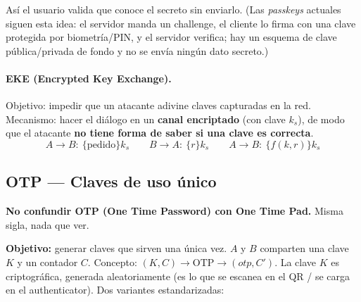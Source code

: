 \documentclass[../main.tex]{subfiles}
\begin{document}
\begin{center}
\end{center}
Así el usuario valida que conoce el secreto sin enviarlo. (Las \emph{passkeys} actuales siguen esta idea: el servidor manda un challenge, el cliente lo firma con una clave protegida por biometría/PIN, y el servidor verifica; hay un esquema de clave pública/privada de fondo y no se envía ningún dato secreto.)

\paragraph{EKE (Encrypted Key Exchange).} Objetivo: impedir que un atacante adivine claves capturadas en la red. Mecanismo: hacer el diálogo en un \textbf{canal encriptado} (con clave $k_s$), de modo que el atacante \textbf{no tiene forma de saber si una clave es correcta}.
$$A\to B:\ \{\text{pedido}\}k_s \qquad B\to A:\ \{r\}k_s \qquad A\to B:\ \{f(k,r)\}k_s$$

\subsection{OTP --- Claves de uso único}

\begin{ojo}
\textbf{No confundir OTP (One Time Password) con One Time Pad.} Misma sigla, nada que ver.
\end{ojo}

\textbf{Objetivo:} generar claves que sirven una única vez. $A$ y $B$ comparten una clave $K$ y un contador $C$. Concepto: $(K,C)\rightarrow \text{OTP}\rightarrow(otp,C')$. La clave $K$ es criptográfica, generada aleatoriamente (es lo que se escanea en el QR / se carga en el authenticator). Dos variantes estandarizadas:
\end{document}
